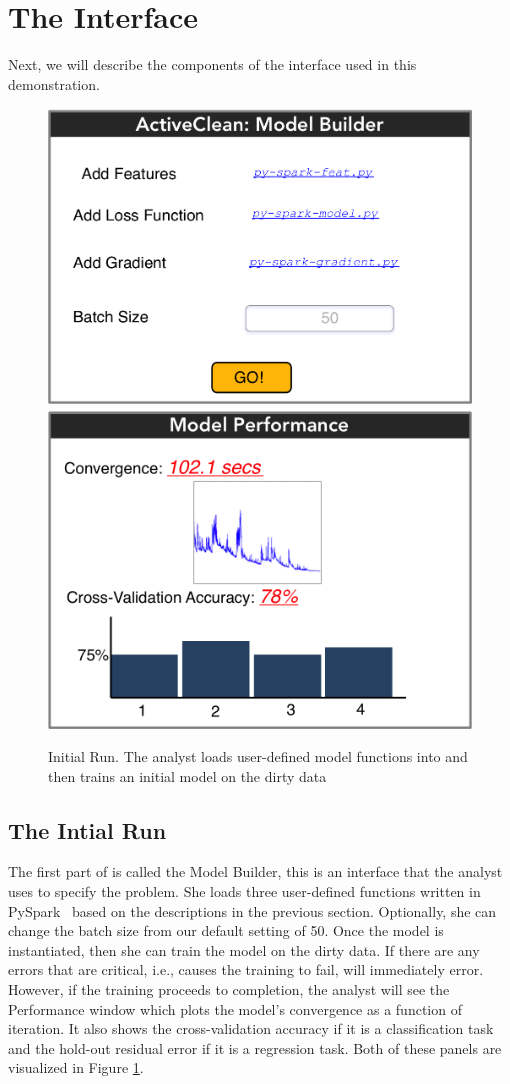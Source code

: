 \section{The Interface}
Next, we will describe the components of the \sys interface used in this demonstration.


\begin{figure}[t]
\centering
 \includegraphics[width=0.48\columnwidth]{figs/interface1.png}
 \includegraphics[width=0.48\columnwidth]{figs/interface2.png}
 \caption{Initial Run. The analyst loads user-defined model functions into \sys and then trains an initial model on the dirty data \label{irun}}
\end{figure}

\subsection{The Intial Run}
The first part of \sys is called the \textsf{Model Builder}, this is an interface that the analyst uses to specify the problem.
She loads three user-defined functions written in PySpark~\cite{pyspark} based on the descriptions in the previous section.
Optionally, she can change the batch size from our default setting of 50.
Once the model is instantiated, then she can train the model on the dirty data.
If there are any errors that are critical, i.e., causes the training to fail, \sys will immediately error.
However, if the training proceeds to completion, the analyst will see the \textsf{Performance} window which plots the model's convergence as a function of iteration.
It also shows the cross-validation accuracy if it is a classification task and the hold-out residual error if it is a regression task.
Both of these panels are visualized in Figure \ref{irun}.

